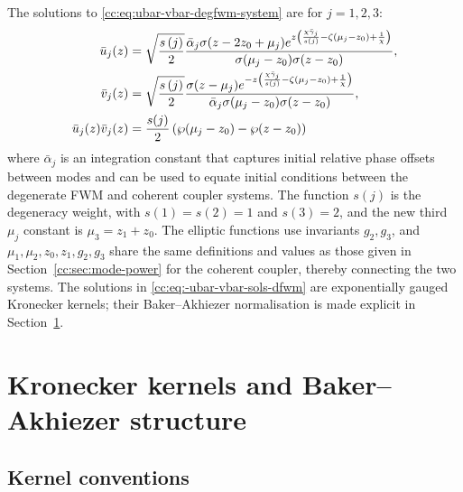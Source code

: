 \documentclass[11pt,a4paper]{article}
\numberwithin{equation}{section}
\begin{document}
The solutions to \eqref{cc:eq:ubar-vbar-degfwm-system} are for $j=1,2,3$:
\begin{align}
\bar{u}_j{\left(z\right)} &= \sqrt{\frac{s\left(j\right)}{2}}\frac{{\bar{\alpha}}_{j}\sigma{\left(z - 2 z_{0} + {\mu}_{j}\right)} e^{z \left(\frac{\chi {\bar{\gamma}}_{j}}{s{\left(j \right)}} - \zeta{\left({\mu}_{j} - z_{0}\right)} + \frac{1}{\chi}\right)}}{\sigma{\left({\mu}_{j} - z_{0}\right)} \sigma{\left(z - z_{0}\right)  }}, \notag \\
\bar{v}_j{\left(z\right)} &= \sqrt{\frac{s\left(j\right)}{2}}\frac{\sigma{\left(z - {\mu}_{j}\right)} e^{- z \left(\frac{\chi {\bar{\gamma}}_{j}}{s{\left(j \right)}} - \zeta{\left({\mu}_{j} - z_{0}\right)} + \frac{1}{\chi}\right)}}{{\bar{\alpha}}_{j} \sigma{\left({\mu}_{j} - z_{0}\right)} \sigma{\left(z - z_{0}\right)} }, \notag \\
\bar{u}_j{\left(z\right)} \bar{v}_j{\left(z\right)} &= \frac{s{\left(j \right)}}{2}\left(\wp{\left({\mu}_{j} - z_{0} \right)} - \wp{\left(z - z_{0}\right)}\right) \label{cc:eq:-ubar-vbar-sols-dfwm}
\end{align}
where $\bar{\alpha}_j$ is an integration constant that captures initial relative phase offsets between modes and can be used to equate initial conditions between the degenerate FWM and coherent coupler systems. 
The function $s(j)$ is the degeneracy weight, with $s(1)=s(2)=1$ and $s(3)=2$, and the new third $\mu_j$ constant is $\mu_3 = z_1 + z_0$. The elliptic functions use invariants $g_2, g_3$, and $\mu_1, \mu_2, z_0, z_1, g_2, g_3$ share the same definitions and values as those given in Section~\ref{cc:sec:mode-power} for the coherent coupler, thereby connecting the two systems. 
The solutions in \eqref{cc:eq:-ubar-vbar-sols-dfwm} are exponentially gauged Kronecker kernels; their Baker--Akhiezer normalisation is made explicit in Section~\ref{sec:elliptic-structure}.
\section{Kronecker kernels and Baker--Akhiezer structure}\label{sec:elliptic-structure}

\subsection{Kernel conventions}
\label{subsec:kronecker-ba}
\end{document}
